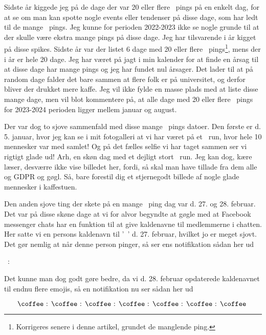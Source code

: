 \begin{article}
Sidste år kiggede jeg på de dage der var 20 eller flere \coffee\ pings på en enkelt dag, for at se om man kan spotte nogle events eller tendenser på disse dage, som har ledt til de mange \coffee\ pings. Jeg kunne for perioden 2022-2023 ikke se nogle grunde til at der skulle være ekstra mange pings på disse dage.
Jeg har tilsvarende i år kigget på disse spikes. Sidste år var der listet 6 dage med 20 eller flere \coffee\ pings\footnote{Korrigeres senere i denne artikel, grundet de manglende ping.}, mens der i år er hele 20 dage. Jeg har været på jagt i min kalender for at finde en årsag til at disse dage har mange pings og jeg har fundet nul årsager. Det lader til at på random dage falder det bare sammen at flere folk er på universitet, og derfor bliver der drukket mere kaffe. Jeg vil ikke fylde en masse plads med at liste disse mange dage, men vil blot kommentere på, at alle dage med 20 eller flere \coffee\ pings for 2023-2024 perioden ligger mellem januar og august.

Der var dog to sjove sammenfald med disse mange \coffee\ pings datoer. Den første er d. 5. januar, hvor jeg kan se i mit fotogalleri at vi har været på et \coffee\ run, hvor hele 10 mennesker var med samlet! Og på det fælles selfie vi har taget sammen ser vi rigtigt glade ud! Arh, en skøn dag med et dejligt stort \coffee\ run. Jeg kan dog, kære læser, desværre ikke vise billedet her, fordi, så skal man have tillade fra dem alle og GDPR og gøgl. Så, bare forestil dig et stjernegodt billede af nogle glade mennesker i kaffestuen.

Den anden sjove ting der skete på en mange \coffee\ ping dag var d. 27. og 28. februar. Det var på disse skøne dage at vi for alvor begyndte at gøgle med at Facebook messenger chats har en funktion til at give kaldenavne til medlemmerne i chatten. Her satte vi en persons kaldenavn til '\coffee\ \!' d. 27. februar, hvilket jo er meget sjovt. Det gør nemlig at når denne person pinger, så ser ens notifikation sådan her ud
\begin{center}
	\coffee\ : \coffee\
\end{center}

\noindent
Det kunne man dog godt gøre bedre, da vi d. 28. februar opdaterede kaldenavnet til endnu flere emojis, så en notifikation nu ser sådan her ud

\[ \text{\coffee\ : \coffee\ : \coffee\ : \coffee\ : \coffee\ : \coffee\ : \coffee\ } \]


\end{article}
